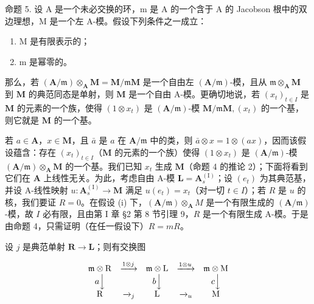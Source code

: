 命题 5. 设 A 是一个未必交换的环，m 是 A 的一个含于 A 的 Jacobson 根中的双边理想，M 是一个左 A-模。假设下列条件之一成立：

\begin{enumerate}
\def\labelenumi{(\roman{enumi})}
\item
  M 是有限表示的；
\item
  m 是幂零的。
\end{enumerate}

那么，若 \((\mathbf{A} / \mathfrak{m})\otimes_{\mathbf{A}}\mathbf{M} = \mathbf{M} / \mathfrak{m}\mathbf{M}\) 是一个自由左 \((\mathbf{A} / \mathfrak{m})\)-模，且从 \(\mathfrak{m}\otimes_{\mathbf{A}}\mathbf{M}\) 到 \(\mathbf{M}\) 的典范同态是单射，则 \(\mathbf{M}\) 是一个自由 A-模。更确切地说，若 \((x_{t})_{t\in I}\) 是 \(\mathbf{M}\) 的元素的一个族，使得 \((1\otimes x_{t})\) 是 \((\mathbf{A} / \mathfrak{m})\)-模 \(\mathbf{M} / \mathfrak{m}\mathbf{M}, (x_{t})\) 的一个基，则它就是 \(\mathbf{M}\) 的一个基。

若 \(a \in \mathbf{A}\)，\(x \in \mathbf{M}\)，且 \(\bar{a}\) 是 \(a\) 在 \(\mathbf{A} / \mathfrak{m}\) 中的类，则 \(\bar{a} \otimes x = 1 \otimes (ax)\)，因而该假设蕴含：存在 \((x_{t})_{t \in I}\)（\(\mathbf{M}\) 的元素的一个族）使得 \((1 \otimes x_{t})\) 是 \((\mathbf{A} / \mathfrak{m})\)-模 \((\mathbf{A} / \mathfrak{m}) \otimes_{\mathbf{A}} \mathbf{M}\) 的一个基。我们已知 \(x_{t}\) 生成 \(\mathbf{M}\)（命题 4 的推论 2）；下面将看到它们在 \(\mathbf{A}\) 上线性无关。为此，考虑自由 A-模 \(\mathbf{L} = \mathbf{A}_{s}^{(\mathrm{I})}\)；设 \((e_{t})\) 为其典范基，并设 A-线性映射 \(u: \mathbf{A}_{s}^{(\mathrm{I})} \to \mathbf{M}\) 满足 \(u(e_{t}) = x_{t}\)（对一切 \(t \in I\)）；若 \(R\) 是 \(u\) 的核，我们要证 \(R = 0\)。在假设 (i) 下，\((\mathbf{A} / \mathfrak{m}) \otimes_{\mathbf{A}} M\) 是一个有限生成的 \((\mathbf{A} / \mathfrak{m})\)-模，故 \(I\) 必有限，且由第 I 章 §2 第 8 节引理 9，\(R\) 是一个有限生成 A-模。于是由命题 4，只需证明（在任一假设下）\(R = mR\)。

设 \(j\) 是典范单射 \(\mathbf{R} \to \mathbf{L}\)；则有交换图

\[
\begin{array}{c c c c c} \mathfrak {m} \otimes \mathrm{R} & \xrightarrow {1 \otimes j} & \mathfrak {m} \otimes \mathrm{L} & \xrightarrow {1 \otimes u} & \mathfrak {m} \otimes \mathrm{M} \\ a \Big \downarrow & & b \Big \downarrow & & c \Big \downarrow \\ \mathrm{R} & \xrightarrow {} _ {j} & \mathrm{L} & \xrightarrow {} _ {u} & \mathrm{M} \end{array}
\]

